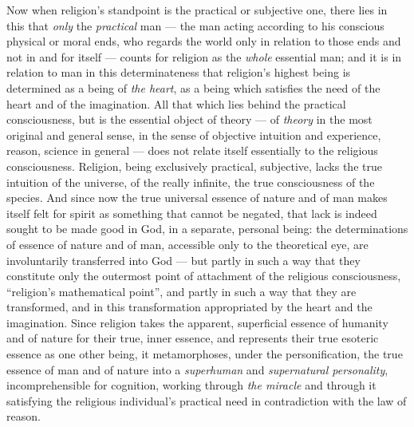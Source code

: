 \documentclass[12pt,a4paper]{book}
\begin{document}
Now when religion's standpoint is the practical or subjective one, there lies
in this that \emph{only} the \emph{practical} man --- the man acting according
to his conscious physical or moral ends, who regards the world only in
relation to those ends
and not in and for itself --- counts for religion as the \emph{whole}
essential man; and it is in relation to man in this determinateness that
religion's highest being is determined as a being of \emph{the heart}, as a
being which satisfies the need of the heart and of the imagination. All that
which lies behind the practical consciousness, but is the essential object of
theory --- of \emph{theory} in the most original and general sense, in the
sense of objective intuition and experience, reason, science in general ---
does not relate itself essentially to the religious consciousness. Religion,
being exclusively practical, subjective, lacks the true intuition of the
universe, of the really infinite, the true consciousness of the species. And
since now the true universal essence of nature and of man makes itself felt
for spirit as something that cannot be negated, that lack is indeed sought to
be made good in God, in a separate, personal being: the determinations of
essence of nature and of man, accessible only to the theoretical eye, are
involuntarily transferred into God --- but partly in such a way that they
constitute only the outermost point of attachment of the religious
consciousness, ``religion's mathematical point'', and partly in such a way
that they are transformed, and in this transformation appropriated by the
heart and the imagination. Since religion takes the apparent, superficial
essence of humanity and of nature for their true, inner essence, and
represents their true esoteric essence as one other being, it metamorphoses,
under the personification, the true essence of man and of nature into a
\emph{superhuman} and \emph{supernatural personality}, incomprehensible for
cognition, working through \emph{the miracle} and through it satisfying the
religious individual's practical need in contradiction with the law of reason.
\end{document}

